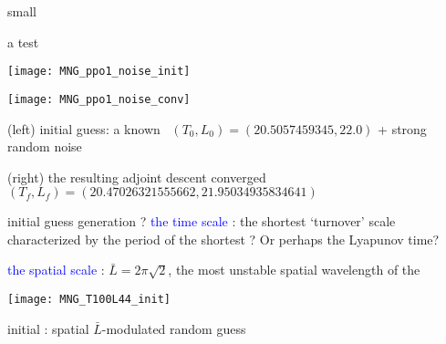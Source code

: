 \begin{frame}{small \twot}
\begin{block}{a test}
\begin{minipage}[height=.40\textheight]{.35\textwidth}
\centering %
\texttt{[image: MNG\_ppo1\_noise\_init]}
\end{minipage}
\begin{minipage}[height=.40\textheight]{.35\textwidth}
\centering %
\texttt{[image: MNG\_ppo1\_noise\_conv]}
\end{minipage}
\end{block}

(left) initial guess: a known %
\twot\
$(T_0,L_0)=(20.5057459345,22.0)$
+
strong random noise

\medskip

(right) the resulting adjoint descent converged \twot\
$(T_f,L_f)=(20.47026321555662,21.95034935834641)$
\end{frame}

\begin{frame}{initial guess generation ?}
 \textcolor{blue}{the time scale} : the shortest
`turnover' scale characterized by the period of the shortest \po? Or perhaps
the Lyapunov time?

\bigskip

\textcolor{blue}{the spatial scale} :
$\bar{L}=2\pi\sqrt{2}$, the  most unstable spatial wavelength of the \KS

\bigskip

\begin{minipage}[height=.32\textheight]{.30\textwidth}
\texttt{[image: MNG\_T100L44\_init]}
\end{minipage}

\medskip
initial : spatial $\bar{L}$-modulated random guess

\end{frame}

